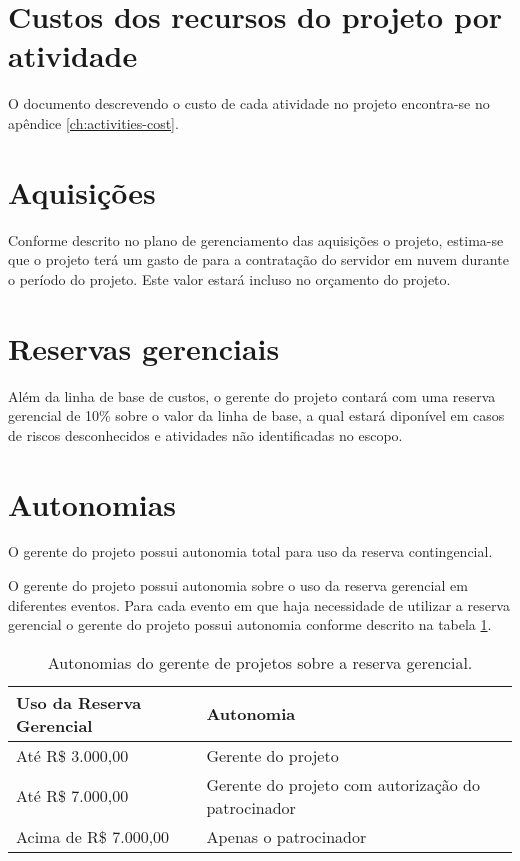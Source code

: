 \section{Custos dos recursos do projeto por atividade}

O documento descrevendo o custo de cada atividade no projeto encontra-se no apêndice \ref{ch:activities-cost}.

\section{Aquisições}

Conforme descrito no plano de gerenciamento das aquisições o projeto, estima-se que o projeto terá um gasto de \procurementBudget{} para a contratação do servidor em nuvem durante o período do projeto. Este valor estará incluso no orçamento do projeto.

\section{Reservas gerenciais}

Além da linha de base de custos, o gerente do projeto contará com uma reserva gerencial de 10\% sobre o valor da linha de base, a qual estará diponível em casos de riscos desconhecidos e atividades não identificadas no escopo.

\section{Autonomias}

O gerente do projeto possui autonomia total para uso da reserva contingencial.

O gerente do projeto possui autonomia sobre o uso da reserva gerencial em diferentes eventos. Para cada evento em que haja necessidade de utilizar a reserva gerencial o gerente do projeto possui autonomia conforme descrito na tabela \ref{tab:project-manager-cost-autonomy}.

\begin{table}[h]
	\centering
	\begin{tabular}{| l | l |}
		\hline
		\textbf{Uso da Reserva Gerencial} & \textbf{Autonomia}                                   \\
		\hline
		Até R\$ 3.000,00                 & Gerente do projeto                                   \\
		\hline
		Até R\$ 7.000,00                 & Gerente do projeto com autorização do patrocinador \\
		\hline
		Acima de R\$ 7.000,00             & Apenas o patrocinador                                \\
		\hline
	\end{tabular}
	\caption{Autonomias do gerente de projetos sobre a reserva gerencial.}
	\label{tab:project-manager-cost-autonomy}
\end{table}


